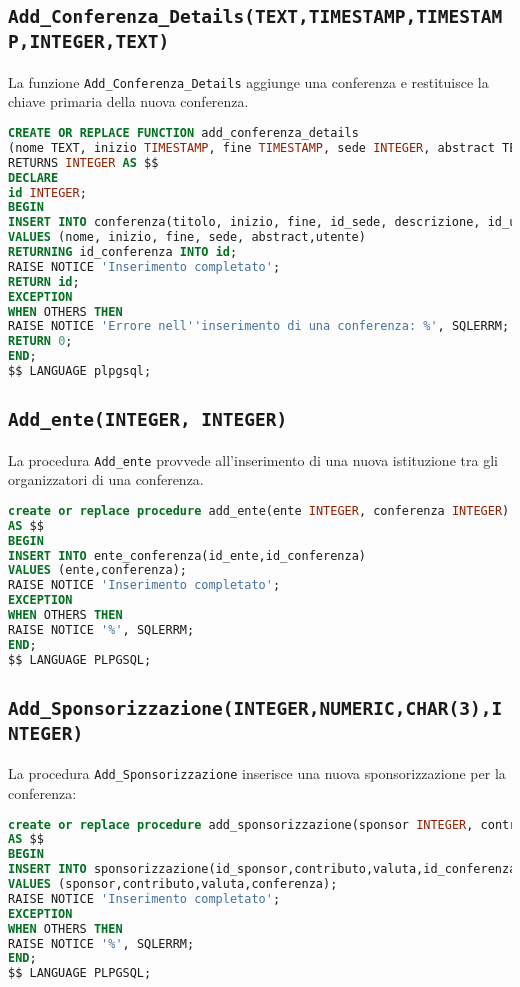 \subsection{\texttt{Add\_Conferenza\_Details(TEXT,TIMESTAMP,TIMESTAMP,INTEGER,TEXT)}}
La funzione \texttt{Add\_Conferenza\_Details} aggiunge una conferenza e restituisce la chiave primaria della nuova conferenza.
\begin{lstlisting}[language=SQL,style=mystyle]
CREATE OR REPLACE FUNCTION add_conferenza_details
(nome TEXT, inizio TIMESTAMP, fine TIMESTAMP, sede INTEGER, abstract TEXT, utente INTEGER)
RETURNS INTEGER AS $$
DECLARE
id INTEGER;
BEGIN
INSERT INTO conferenza(titolo, inizio, fine, id_sede, descrizione, id_utente) 
VALUES (nome, inizio, fine, sede, abstract,utente)
RETURNING id_conferenza INTO id;
RAISE NOTICE 'Inserimento completato';
RETURN id;
EXCEPTION
WHEN OTHERS THEN
RAISE NOTICE 'Errore nell''inserimento di una conferenza: %', SQLERRM;
RETURN 0; 
END;
$$ LANGUAGE plpgsql;
\end{lstlisting}
\subsection{\texttt{Add\_ente(INTEGER, INTEGER)}}
La procedura \texttt{Add\_ente} provvede all'inserimento di una nuova istituzione tra gli organizzatori di una conferenza.
\begin{lstlisting}[language=SQL,style=mystyle]
create or replace procedure add_ente(ente INTEGER, conferenza INTEGER)
AS $$
BEGIN
INSERT INTO ente_conferenza(id_ente,id_conferenza)
VALUES (ente,conferenza);
RAISE NOTICE 'Inserimento completato';
EXCEPTION
WHEN OTHERS THEN
RAISE NOTICE '%', SQLERRM;
END;
$$ LANGUAGE PLPGSQL;
\end{lstlisting}
\subsection{\texttt{Add\_Sponsorizzazione(INTEGER,NUMERIC,CHAR(3),INTEGER)}}
La procedura \texttt{Add\_Sponsorizzazione} inserisce una nuova sponsorizzazione per la conferenza:
\begin{lstlisting}[language=SQL, style=mystyle]
create or replace procedure add_sponsorizzazione(sponsor INTEGER, contributo NUMERIC(1000,2), valuta CHAR(3), conferenza INTEGER)
AS $$
BEGIN
INSERT INTO sponsorizzazione(id_sponsor,contributo,valuta,id_conferenza)
VALUES (sponsor,contributo,valuta,conferenza);
RAISE NOTICE 'Inserimento completato';
EXCEPTION
WHEN OTHERS THEN
RAISE NOTICE '%', SQLERRM;
END;
$$ LANGUAGE PLPGSQL;
\end{lstlisting}
